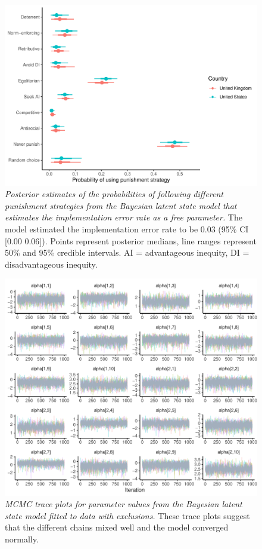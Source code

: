 \documentclass[
  man, donotrepeattitle,floatsintext]{apa6}
\begin{document}
\begin{figure}
\centering
\includegraphics{manuscript_files/figure-latex/plotModel5-1.pdf}
\caption{\label{fig:plotModel5}\emph{Posterior estimates of the probabilities of following
different punishment strategies from the Bayesian latent state model that
estimates the implementation error rate as a free parameter.} The model
estimated the implementation error rate to be 0.03
(95\% CI {[}0.00
0.06{]}). Points represent posterior medians, line
ranges represent 50\% and 95\% credible intervals. AI = advantageous inequity, DI
= disadvantageous inequity.}
\end{figure}

\newpage





\begin{figure}
\centering
\includegraphics{manuscript_files/figure-latex/plotTrace-1.pdf}
\caption{\label{fig:plotTrace}\emph{MCMC trace plots for parameter values from the Bayesian
latent state model fitted to data with exclusions.} These trace plots suggest
that the different chains mixed well and the model converged normally.}
\end{figure}
\end{document}

